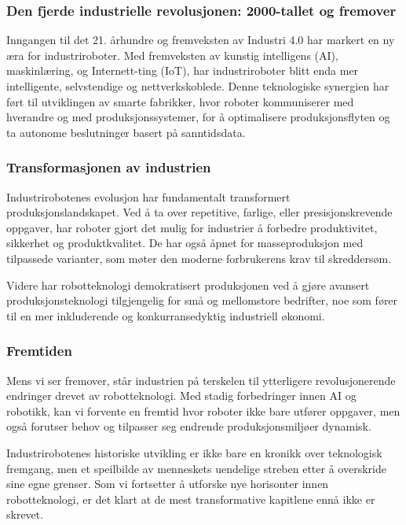 \subsubsection{Den fjerde industrielle revolusjonen: 2000-tallet og fremover}

Inngangen til det 21. århundre og fremveksten av Industri 4.0 har markert en ny æra for industriroboter. Med fremveksten av kunstig intelligens (AI), maskinlæring, og Internett-ting (IoT), har industriroboter blitt enda mer intelligente, selvstendige og nettverkskoblede. Denne teknologiske synergien har ført til utviklingen av smarte fabrikker, hvor roboter kommuniserer med hverandre og med produksjonssystemer, for å optimalisere produksjonsflyten og ta autonome beslutninger basert på sanntidsdata.

\subsubsection{Transformasjonen av industrien}

Industrirobotenes evolusjon har fundamentalt transformert produksjonslandskapet. Ved å ta over repetitive, farlige, eller presisjonskrevende oppgaver, har roboter gjort det mulig for industrier å forbedre produktivitet, sikkerhet og produktkvalitet. De har også åpnet for masseproduksjon med tilpassede varianter, som møter den moderne forbrukerens krav til skreddersøm.

Videre har robotteknologi demokratisert produksjonen ved å gjøre avansert produksjonsteknologi tilgjengelig for små og mellomstore bedrifter, noe som fører til en mer inkluderende og konkurransedyktig industriell økonomi.

\subsubsection{Fremtiden}

Mens vi ser fremover, står industrien på terskelen til ytterligere revolusjonerende endringer drevet av robotteknologi. Med stadig forbedringer innen AI og robotikk, kan vi forvente en fremtid hvor roboter ikke bare utfører oppgaver, men også forutser behov og tilpasser seg endrende produksjonsmiljøer dynamisk.

Industrirobotenes historiske utvikling er ikke bare en kronikk over teknologisk fremgang, men et speilbilde av menneskets uendelige streben etter å overskride sine egne grenser. Som vi fortsetter å utforske nye horisonter innen robotteknologi, er det klart at de mest transformative kapitlene ennå ikke er skrevet.



